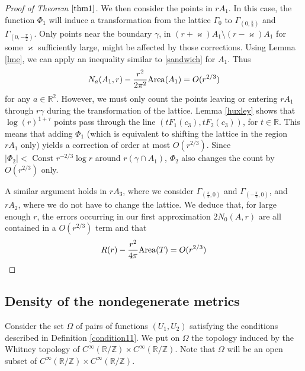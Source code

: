 \documentclass[12pt]{amsart}
\numberwithin{equation}{subsection}
\theoremstyle{definition}
\theoremstyle{plain}
\begin{document}
\begin{proof}[Proof of Theorem $\ref{thm1}$]
We then consider the points in $r A_1$.
In this case, the function $\Phi_1$ will
induce a transformation from the lattice $\Gamma_0$ to $\Gamma_{(0,\frac{\pi}{2})}$ and $\Gamma_{(0,-\frac{\pi}{2})}$.
Only points near the boundary $\gamma$, in $(r + \varkappa) A_1 \setminus (r-\varkappa)A_1$ for some $\varkappa$ sufficiently large,
might be affected by those corrections.
Using Lemma \ref{lme}, we can apply an inequality similar to \eqref{sandwich} for $A_1$. Thus
\[
N_{a}(A_1, r) - \frac{ r^2}{2 \pi^2}{{\rm {Area}}}(A_1) =O(r^{2/3})
\]
for any $a \in \mathbb{R}^2$. However, we must only count the points leaving or entering $rA_1$ through $r\gamma$
during the transformation of the lattice.
Lemma \ref{huxley} shows that $\log(r)^{1+\tau}$ points pass through the line $(t F_1(c_3), tF_2(c_3))$, for $t \in \mathbb R$.
This means that adding $\Phi_1$ (which is equivalent to shifting the lattice in the region $r A_1$ only)
yields a correction of order at most $O(r^{2/3})$.
Since $|\Phi_2| < \text{ Const }  r^{-2/3} \log r$ around $r (\gamma \cap A_1)$, $\Phi_2$ also changes the count
by $O(r^{2/3})$ only.

A similar argument holds in $r A_3$, where we consider $\Gamma_{(\frac{\pi}{2},0)}$ and $\Gamma_{(-\frac{\pi}{2},0)}$,
and $r A_2$, where we do not have to change the lattice.
We deduce that, for large enough $r$, the errors occurring in our first approximation $2N_0(A,r)$
are all contained in a $O(r^{2/3})$ term and that
\[
R(r)- \frac{r^{2}}{4 \pi} {{\rm {Area}}}(T) = O(r^{2/3})
\]

\end{proof}

\subsection{Density of the nondegenerate metrics}
\label{density}

Consider the set $\Omega$ of pairs of functions $(U_1,U_2)$ satisfying the conditions described in Definition \ref{condition11}.
We put on $\Omega$ the topology induced by the Whitney topology of $C^{\infty}(\mathbb R / \mathbb Z) \times C^{\infty}(\mathbb R / \mathbb Z)$.
Note that $\Omega$ will be an open subset of $C^{\infty}(\mathbb R / \mathbb Z) \times C^{\infty}(\mathbb R / \mathbb Z)$.
\end{document}
